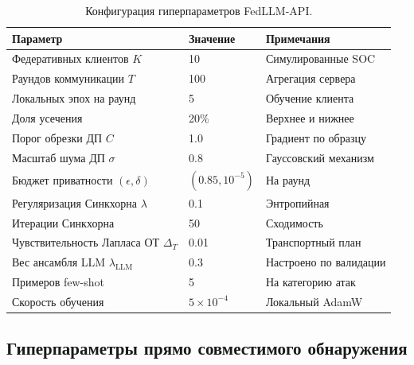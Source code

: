 \begin{table}[htbp]
\centering
\caption{Конфигурация гиперпараметров FedLLM-API.}
\label{tab:hp_fedllm}
\begin{tabular}{lll}
\toprule
Параметр & Значение & Примечания \\
\midrule
Федеративных клиентов $K$  & 10    & Симулированные SOC \\
Раундов коммуникации $T$   & 100   & Агрегация сервера \\
Локальных эпох на раунд    & 5     & Обучение клиента \\
Доля усечения              & 20\%  & Верхнее и нижнее \\
Порог обрезки ДП $C$       & 1.0   & Градиент по образцу \\
Масштаб шума ДП $\sigma$   & 0.8   & Гауссовский механизм \\
Бюджет приватности $(\epsilon,\delta)$ & $(0.85,10^{-5})$ & На раунд \\
Регуляризация Синкхорна $\lambda$ & 0.1 & Энтропийная \\
Итерации Синкхорна         & 50    & Сходимость \\
Чувствительность Лапласа ОТ $\Delta_T$ & 0.01 & Транспортный план \\
Вес ансамбля LLM $\lambda_{\mathrm{LLM}}$ & 0.3 & Настроено по валидации \\
Примеров few-shot          & 5     & На категорию атак \\
Скорость обучения          & $5\times10^{-4}$ & Локальный AdamW \\
\bottomrule
\end{tabular}
\end{table}


\subsection{Гиперпараметры прямо совместимого обнаружения}
\label{app:hp_pqidps}

